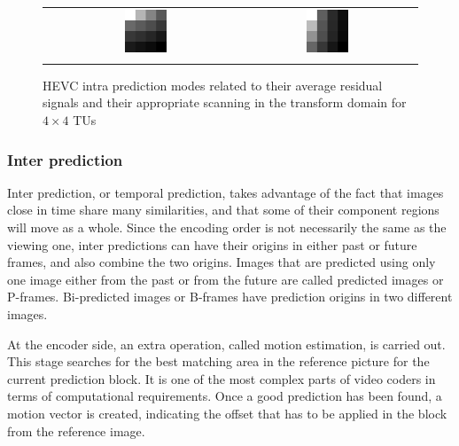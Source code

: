 \documentclass[11pt,a4paper,openright,twoside]{book}
\numberwithin{equation}{section} %
\numberwithin{figure}{section} %
\numberwithin{table}{section} %
\begin{document}
\begin{figure}[tb]
\begin{minipage}{0.48\textwidth}
\begin{tabular}[H]{ccc}
			&
			\includegraphics[width=0.25\textwidth]{figures/coeffs-scan-horz.png}
			&
			\includegraphics[width=0.25\textwidth]{figures/coeffs-scan-vert.png}
			\\
			\color{red}{diagonal} & \color{greenish}{horizontal} & \color{blue}{vertical} \\
		\end{tabular}
	\end{minipage}
	\caption{\acs{HEVC} intra prediction modes related to their average
	residual signals and their appropriate scanning in the transform
	domain for $4\times4$ \acsp{TU}}
	\label{fig:mdcs}
\end{figure}


\subsubsection{Inter prediction}
\label{ssub:inter_prediction}

Inter prediction, or temporal prediction, takes advantage of the fact that
images close in time share many similarities, and that some of their component
regions will move as a whole.
Since the encoding order is not necessarily the same as the viewing one, inter
predictions can have their origins in either past or future frames, and also
combine the two origins.
Images that are predicted using only one image either from the past or from
the future are called predicted images or P-frames.
Bi-predicted images or B-frames have prediction origins in two different
images.

At the encoder side, an extra operation, called motion estimation, is
carried out.
This stage searches for the best matching area in the reference picture
for the current prediction block.
It is one of the most complex parts of video coders in terms of computational
requirements.
Once a good prediction has been found, a motion vector is created, indicating
the offset that has to be applied in the block from the reference image.
\end{document}
